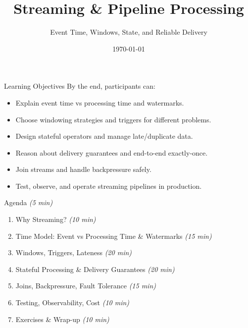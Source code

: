 \documentclass[aspectratio=169,11pt]{beamer}
\title{Streaming \& Pipeline Processing}
\subtitle{Event Time, Windows, State, and Reliable Delivery}
\date{\today}
\newcommand{\mins}[1]{\textit{(#1 min)}}
\begin{document}
\begin{frame}
  \titlepage
\end{frame}

\begin{frame}{Learning Objectives}
  By the end, participants can:
  \begin{itemize}
    \item Explain event time vs processing time and watermarks.
    \item Choose windowing strategies and triggers for different problems.
    \item Design stateful operators and manage late/duplicate data.
    \item Reason about delivery guarantees and end-to-end exactly-once.
    \item Join streams and handle backpressure safely.
    \item Test, observe, and operate streaming pipelines in production.
  \end{itemize}
\end{frame}

\begin{frame}{Agenda \mins{5}}
  \begin{enumerate}
    \item Why Streaming? \mins{10}
    \item Time Model: Event vs Processing Time \& Watermarks \mins{15}
    \item Windows, Triggers, Lateness \mins{20}
    \item Stateful Processing \& Delivery Guarantees \mins{20}
    \item Joins, Backpressure, Fault Tolerance \mins{15}
    \item Testing, Observability, Cost \mins{10}
    \item Exercises \& Wrap-up \mins{10}
  \end{enumerate}
\end{frame}

\end{document}
